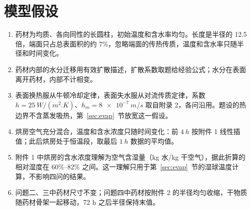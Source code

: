 \section{模型假设}\label{sec:assume}

\begin{enumerate}[label=(\arabic*),leftmargin=2.2em,itemsep=2pt]
\item 药材为均质、各向同性的长圆柱，初始温度和含水率均匀。长度是半径的 12.5 倍，端面只占总表面积的约 7\%，忽略端面的传热传质，温度和含水率只随半径和时间变化。
\item 药材内部的水分迁移用有效扩散描述\cite{whitaker}，扩散系数取题给经验公式；水分在表面离开药材，内部不计相变。
\item 表面换热服从牛顿冷却定律，表面失水服从对流传质定律，系数 $h=\SI{25}{W/(m^2.K)}$、$h_m=\SI{8e-7}{m/s}$ 取自附录 2，各问沿用。题设的热边界不含蒸发吸热，第~\ref{sec:evap}~节放宽这一假设。
\item 烘房空气充分混合，温度和含水浓度只随时间变化：前 $\SI{4}{h}$ 按附件 1 线性插值；此后烘房处于恒温段，取最后 $\SI{1}{h}$ 数据的平均值。
\item 附件 1 中烘房的含水浓度理解为空气含湿量（kg 水/kg 干空气），据此折算的相对湿度在 60\%--82\% 之间。这一理解只用于第~\ref{sec:evap}~节的湿球温度计算，不影响四问的结果。
\item 问题二、三中药材尺寸不变；问题四中药材按附件 2 的半径均匀收缩，干物质随药材骨架一起移动，72 h 之后半径保持末值。
\end{enumerate}
